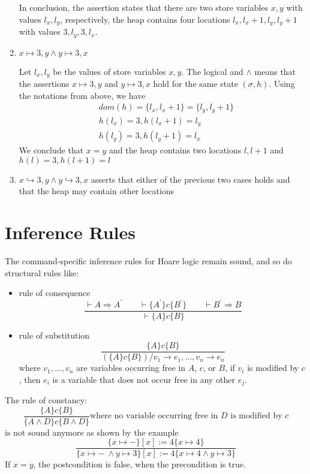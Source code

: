\documentclass[12pt]{article}
\begin{document}
\begin{enumerate}
In conclusion, the assertion states that there are two store variables $x,y$ with values $l_x,l_y$, respectively, the heap contains four locations $l_x,l_{x}+1,l_y,l_{y}+1$ with values $3,l_y,3,l_x$.

\item $x \mapsto 3,y \wedge y \mapsto 3,x$

Let $l_x, l_y$ be the values of store variables $x,y$. The logical and $\wedge$ means that the assertions $x \mapsto 3,y$ and $y \mapsto 3,x$ hold for the same state $(\sigma,h)$. Using the notations from above, we have
\begin{align*}
&dom(h)=\{l_x,l_x+1\}=\{l_y,l_y+1\}\\
&h(l_x) = 3, h(l_x+1)=l_y\\
&h(l_y)=3, h(l_y+1) = l_x
\end{align*} 
We conclude that $x=y$ and the heap contains two locations $l,l+1$ and $h(l)=3, h(l+1) = l$

\item $x \hookrightarrow 3,y \wedge y \hookrightarrow 3,x$ asserts that either of the previous two cases holds and that the heap may contain other locations
\end{enumerate}

\section{Inference Rules} \label{sec:rules}

The command-specific inference rules for Hoare logic remain sound, and so do structural rules like:
\begin{itemize}
\item rule of consequence
\[
\frac{\vdash A \Rightarrow A^\prime \qquad \vdash \{A^\prime\}c\{B^\prime\} \qquad \vdash B^\prime \Rightarrow B}{\vdash\{A\}c\{B\}}
\] 
\item rule of substitution
\[
\frac{ \{A\}c\{B\} }{ (\{A\}c\{B\} )/v_1 \rightarrow e_1, \dots, v_n \rightarrow e_n } 
\] where $v_1, \dots, v_n$ are variables occurring free in $A$, $c$, or $B$, if $v_i$ is modified by $c$, then $e_i$ is a variable that does not occur free in any other $e_j$. 
\end{itemize}

The rule of constancy:
\[
\frac{\{A\}c\{B\}}{\{A \wedge D \}c\{B \wedge D\}} \mbox{where no variable occurring free in }D\mbox{ is modified by }c
\]is not sound anymore as shown by the example
\[
\frac{\{x\mapsto -\} [x]:=4 \{x\mapsto 4 \} }{\{x\mapsto -\ \wedge y \mapsto 3 \} [x]:=4 \{x\mapsto 4 \wedge y \mapsto 3 \}}
\] If $x=y$, the postcondition is false, when the precondition is true.
\end{document}
